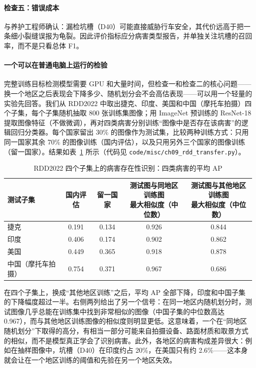 \paragraph{检查五：错误成本} 与养护工程师确认：漏检坑槽（D40）可能直接威胁行车安全，其代价远高于把一条细小裂缝误报为龟裂。因此评价指标应分病害类型报告，并单独关注坑槽的召回率，而不是只看总体 F1。

\paragraph{一个可以在普通电脑上运行的检验} 完整训练目标检测模型需要 GPU 和大量时间，但检查一和检查二的核心问题——换一个地区之后表现会下降多少、随机划分会不会高估表现——可以用一个轻量的实验先回答。我们从 RDD2022 中取出捷克、印度、美国和中国（摩托车拍摄）四个子集，每个子集随机抽取 800 张训练集图像；用 ImageNet 预训练的 ResNet-18 提取图像特征（不做微调），再对四类病害分别训练“图像中是否存在该病害”的逻辑回归分类器。每个国家留出 30\% 的图像作为测试集，比较两种训练方式：只用同一国家其余 70\% 的图像训练（国内评估），以及只用另外三个国家的图像训练（留一国家）。结果如表~\ref{tab:ch9_rdd} 所示（代码见 \texttt{code/misc/ch09\_rdd\_transfer.py}）。

\begin{table}[H]
\centering
\caption{RDD2022 四个子集上的病害存在性识别：四类病害的平均 AP}
\label{tab:ch9_rdd}
\small
\begin{tabular}{lcccc}
\toprule
测试子集 & 国内评估 & 留一国家 & \makecell{测试图与同地区训练图\\最大相似度（中位数）} & \makecell{测试图与其他地区训练图\\最大相似度（中位数）} \\
\midrule
捷克 & 0.191 & 0.134 & 0.926 & 0.844 \\
印度 & 0.406 & 0.174 & 0.902 & 0.862 \\
美国 & 0.449 & 0.365 & 0.918 & 0.878 \\
中国（摩托车拍摄） & 0.754 & 0.371 & 0.967 & 0.686 \\
\bottomrule
\end{tabular}
\end{table}

在四个子集上，换成“其他地区训练”之后，平均 AP 全部下降，印度和中国子集的下降幅度超过一半。右侧两列给出了另一个信号：在同一地区内随机划分时，测试图像几乎总能在训练集中找到非常相似的图像（中国子集的中位数高达 0.967），而与其他地区训练图像的相似度则明显更低。这意味着，一个在“同地区随机划分”下取得的高分，有相当一部分可能来自拍摄设备、路面材质和取景方式的相似，而不是模型真正学会了识别病害。此外，各地区的病害构成差异很大：例如在抽样图像中，坑槽（D40）在印度约占 20\%，在美国只有约 2.6\%——这本身就会让在一个地区训练的阈值和先验在另一个地区失效。

